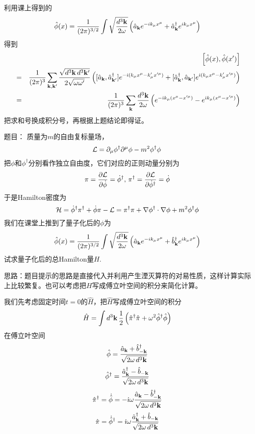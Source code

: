 \documentclass[CJK]{beamer}
\begin{document}
\begin{frame}
\bch
利用课上得到的
$${\hat{\phi}}(x) = \frac{1}{(2\pi)^{3/2}} \int \sqrt{\frac{d^3{\mathbf{k}}}{2\omega}} \left({\hat{a}}_{{\mathbf{k}}} e^{-ik_\mu x^\mu} + {\hat{a}^\dagger}_{{\mathbf{k}}}e^{ik_\mu x^\mu}\right) $$
得到
{\scriptsize
\begin{eqnarray}
&& \left[{\hat{\phi}}(x),{\hat{\phi}}(x')\right] \nonumber \\
&=& \frac{1}{(2\pi)^3}\sum_{{\mathbf{k}},{\mathbf{k}}'} \frac{\sqrt{d^3{\mathbf{k}}\, d^3{\mathbf{k}}'}}{2\sqrt{\omega \omega'}}\left([{\hat{a}}_{\mathbf{k}}, {\hat{a}^\dagger}_{{\mathbf{k}}'}]e^{-{\dot{\imath}} (k_\mu x^\mu-k'_\mu x'^\mu)} + [{\hat{a}^\dagger}_{\mathbf{k}}, {\hat{a}}_{{\mathbf{k}}'}]e^{{\dot{\imath}} (k_\mu x^\mu-k'_\mu x'^\mu) }\right) \nonumber \\
&=& \frac{1}{(2\pi)^3} \sum_{{\mathbf{k}}} \frac{d^3{\mathbf{k}}}{2\omega}\left(e^{-{\dot{\imath}} k_\mu (x^\mu - x'^\mu)} - e^{{\dot{\imath}} k_\mu (x^\mu - x'^\mu)}\right) \nonumber
\end{eqnarray}
}
把求和号换成积分号，再根据上题结论即得证。
\ech
\end{frame}

\begin{frame}
\bch
题目：
{\scriptsize 
质量为$m$的自由复标量场，
$${\mathcal{L}} = \partial_\mu\phi^\dagger \partial^\mu \phi - m^2\phi^\dagger\phi\, $$
把$\phi$和$\phi^\dagger$分别看作独立自由度，它们对应的正则动量分别为
$$\pi = \frac{\partial {\mathcal{L}}}{\partial \dot\phi} = \dot\phi^\dagger, \,\pi^\dagger = \frac{\partial {\mathcal{L}}}{\partial \dot\phi^\dagger} = \dot\phi $$
于是Hamilton密度为
$${\mathcal{H}} = \dot\phi^\dagger \pi^\dagger +\dot\phi \pi - {\mathcal{L}} = \pi^\dagger \pi + \nabla\phi^\dagger \cdot\nabla\phi + m^2\phi^\dagger \phi $$
我们在课堂上推到了量子化后的$\phi$为
$${\hat{\phi}}(x) = \frac{1}{(2\pi)^{3/2}} \int \sqrt{\frac{d^3{\mathbf{k}}}{2\omega}} \left({\hat{a}}_{{\mathbf{k}}} e^{-ik_\mu x^\mu} + {\hat{b}^\dagger}_{{\mathbf{k}}}e^{ik_\mu x^\mu}\right) $$
试求量子化后的总Hamilton量$\hat{H}$.
}

\skipline
思路：题目提示的思路是直接代入并利用产生湮灭算符的对易性质，这样计算实际上比较繁复。也可以考虑把$H$写成傅立叶空间的积分来简化计算。
\ech
\end{frame}

\begin{frame}
\bch
我们先考虑固定时间$t=0$的$\hat{H}$，把$\hat{H}$写成傅立叶空间的积分
$$\hat{H} = \int d^3{\mathbf{k}}\, \frac{1}{2}\left({\hat{\pi}}^\dagger{\hat{\pi}} + \omega^2{\hat{\phi}}^\dagger{\hat{\phi}}\right)$$ 
在傅立叶空间
$${\hat{\phi}} = \frac{{\hat{a}}_{{\mathbf{k}}}+{\hat{b}^\dagger}_{-{\mathbf{k}}}}{\sqrt{2\omega\,d^3{\mathbf{k}}}}$$
$${\hat{\phi}}^\dagger =  \frac{{\hat{a}^\dagger}_{{\mathbf{k}}}-{\hat{b}}_{-{\mathbf{k}}}}{\sqrt{2\omega\,d^3{\mathbf{k}}}}$$
$${\hat{\pi}}^\dagger = \dot{{\hat{\phi}}} = -{\dot{\imath}}\omega \frac{{\hat{a}}_{{\mathbf{k}}}-{\hat{b}^\dagger}_{-{\mathbf{k}}}}{\sqrt{2\omega\,d^3{\mathbf{k}}}}$$
$${\hat{\pi}} = \dot{{\hat{\phi}}}^\dagger = {\dot{\imath}} \omega\frac{{\hat{a}^\dagger}_{{\mathbf{k}}}+{\hat{b}}_{-{\mathbf{k}}}}{\sqrt{2\omega\,d^3{\mathbf{k}}}} $$

\ech
\end{frame}
\end{document}
